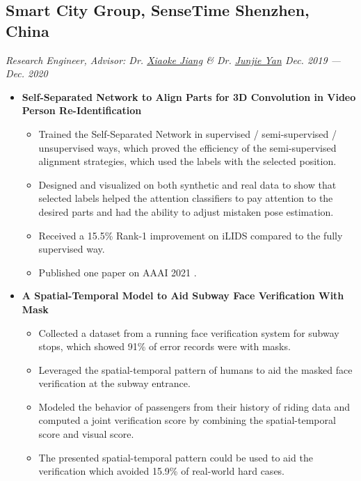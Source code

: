 \documentclass[a4,10pt]{article}
\newcommand{\subtext}[1]{
#1\par\vspace{-0.2cm}}
\newenvironment{zitemize}{
\begin{itemize}\itemsep0pt \parskip0pt \parsep1pt}
{\end{itemize}\vspace{-0.5cm}}
\begin{document}
\subsection*{Smart City Group, SenseTime \hfill Shenzhen, China} 
\subtext{\textit{Research Engineer, Advisor: Dr. \href{https://scholar.google.com/citations?user=aDf9fpkAAAAJ&hl=en} {Xiaoke Jiang}  \& Dr. \href{https://scholar.google.com/citations?user=rEYarG0AAAAJ&hl=en}{Junjie Yan} \hfill Dec. 2019 --- Dec. 2020}}
    \begin{zitemize}
        \item \textbf{Self-Separated Network to Align Parts for 3D Convolution in Video Person Re-Identification}
            \begin{itemize} 
                \item Trained the Self-Separated Network in supervised / semi-supervised / unsupervised ways, which proved the efficiency of the semi-supervised alignment strategies, which used the labels with the selected position. 
                \item Designed and visualized on both synthetic and real data to show that selected labels helped the attention classifiers to pay attention to the desired parts and had the ability to adjust mistaken pose estimation.
                \item Received a 15.5\% Rank-1 improvement on iLIDS compared to the fully supervised way. 
                \item Published one paper on AAAI 2021 \cite{Pap4}.
            \end{itemize}
            
        \item \textbf{A Spatial-Temporal Model to Aid Subway Face Verification With Mask}
            \begin{itemize}
                \item Collected a dataset from a running face verification system for subway stops, which showed 91\% of error records were with masks. 
                \item Leveraged the spatial-temporal pattern of humans to aid the masked face verification at the subway entrance.
                \item Modeled the behavior of passengers from their history of riding data and computed a joint verification score by combining the spatial-temporal score and visual score.
                \item The presented spatial-temporal pattern could be used to aid the verification which avoided 15.9\% of real-world hard cases.
            \end{itemize}

    \end{zitemize}
\end{document}
